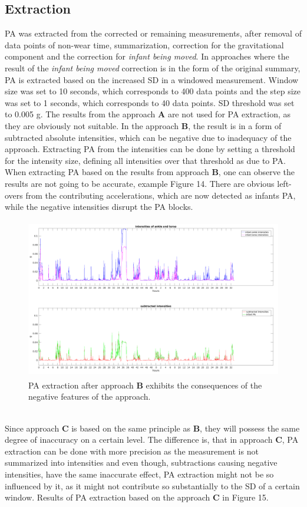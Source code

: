\documentclass{article}
\begin{document}
{\subsection{Extraction}
PA was extracted from the corrected or remaining measurements, after removal of data points of non-wear time, summarization, correction for the gravitational component and the correction for \textit{infant being moved}. In approaches where the result of the \textit{infant being moved} correction is in the form of the original summary, PA is extracted based on the increased SD in a windowed measurement. Window size was set to 10 seconds, which corresponds to 400 data points and the step size was set to 1 seconds, which corresponds to 40 data points. SD threshold was set to 0.005 g. The results from the approach \textbf{A} are not used for PA extraction, as they are  obviously not suitable. In the approach \textbf{B}, the result is in a form of subtracted absolute intensities, which can be negative due to inadequacy of the approach. Extracting PA from the intensities can be done by setting a threshold for the intensity size, defining all intensities over that threshold as due to PA. When extracting PA based on the results from approach \textbf{B}, one can observe the results are not going to be accurate, example Figure 14. There are obvious left-overs from the contributing accelerations, which are now detected as infants PA, while the negative intensities disrupt the PA blocks.
\begin{figure}[h]
\includegraphics[width=15cm, height=7cm]{SubtractedIntensitiesPA.png}
\caption{PA extraction after approach \textbf{B} exhibits the consequences of the negative features of the approach.}
\end{figure}
\\
Since approach \textbf{C} is based on the same principle as \textbf{B}, they will possess the same degree of inaccuracy on a certain level. The difference is, that in approach \textbf{C}, PA extraction can be done with more precision as the measurement is not summarized into intensities and even though, subtractions causing negative intensities, have the same inaccurate effect, PA extraction might not be so influenced by it, as it might not contribute so substantially to the SD of a certain window. Results of PA extraction based on the approach \textbf{C} in Figure 15.
}
\end{document}
